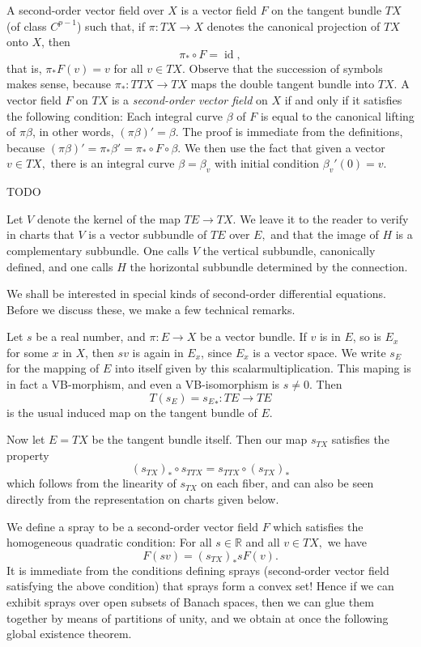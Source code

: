 \documentclass[a5paper,10pt,twoside]{article}
\newcommand{\R}{\ensuremath{\mathbb{R}}}
\DeclareMathOperator*{\id}{id}
\theoremstyle{plain}
\theoremstyle{definition}
\theoremstyle{remark}
\begin{document}
A second-order vector field over $X$ is a vector field $F$ on the tangent bundle  $TX$ (of class $C^{p-1}$) such that, if $\pi:TX\to X$ denotes the canonical projection of $TX$ onto $X$, then
%
\begin{equation}
\pi_*\circ F = {\id},
\end{equation}
%
that is, $\pi_*F(v)=v$ for all $v\in TX$. Observe that the succession of symbols makes sense, because $\pi_*:TTX\to TX$ maps the double tangent bundle into $TX.$ A vector field $F$ on $TX$ is a \textit{second-order vector field} on $X$ if and only if it
satisfies the following condition: Each integral curve $\beta$ of $F$ is equal to the canonical lifting of $\pi\beta$, in other words, $(\pi\beta)'=\beta.$ The proof is immediate from the definitions,
because $(\pi\beta)'=\pi_*\beta'=\pi_*\circ F\circ \beta$. We then use the fact that given a vector $v\in TX,$ there is an integral curve $\beta=\beta_v$ with initial condition $\beta_v'(0)=v.$

TODO

Let $V$ denote the kernel of the map $TE\to TX.$
We leave it to the reader to verify in charts that $V$ is a vector subbundle of $TE$ over $E,$ and that the image of $H$ is a complementary subbundle. One calls $V$ the vertical subbundle, canonically defined, and one calls $H$ the horizontal subbundle determined by the connection.



We shall be interested in special kinds of second-order differential equations. Before we discuss these, we make a few technical remarks.

Let $s$ be a real number, and $\pi: E\to X$ be a vector bundle. If $v$ is in $E$, so is $E_x$ for some $x$ in $X$, then $sv$ is again in $E_x$, since $E_x$ is a vector space. We write $s_E$ for the mapping of $E$ into itself given by this scalarmultiplication. This maping is in fact a VB-morphism, and even a VB-isomorphism is $s\neq 0$. Then
$$
T(s_E)={s_E}_* : TE\to TE
$$
is the usual induced map on the tangent bundle of $E$.

Now let $E = TX$ be the tangent bundle itself. Then our map $s_{TX}$ satisfies the property
$$
(s_{TX})_*\circ s_{TTX} = s_{TTX}\circ (s_{TX})_*
$$
which follows from the linearity of $s_{TX}$ on each fiber, and can also be seen directly  from the representation on charts given below.

We define a spray to be a second-order vector field $F$ which satisfies the homogeneous quadratic condition: For all $s\in\R$ and all $v\in TX,$ we have
$$
F(sv)=(s_{TX})_* sF(v).
$$
It is immediate from the conditions defining sprays (second-order vector field satisfying the above condition) that sprays form a convex set! Hence if we can exhibit sprays over open subsets of Banach spaces, then we can glue them together by means of partitions of unity, and we obtain at once the following global existence theorem.
\end{document}
